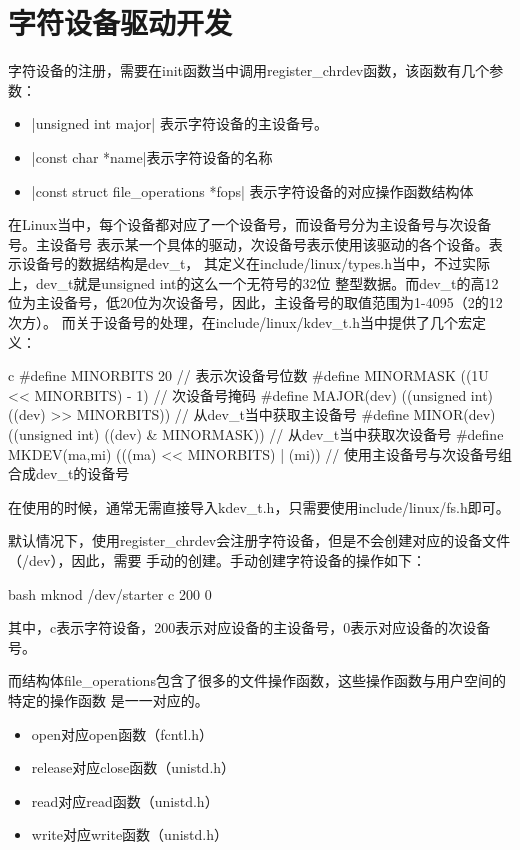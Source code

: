\section{字符设备驱动开发}
字符设备的注册，需要在init函数当中调用register\_chrdev函数，该函数有几个参数：
\begin{itemize}
    \item {}|unsigned int major| 表示字符设备的主设备号。
    \item {}|const char *name|表示字符设备的名称
    \item {}|const struct file_operations *fops| 表示字符设备的对应操作函数结构体
\end{itemize}

在Linux当中，每个设备都对应了一个设备号，而设备号分为主设备号与次设备号。主设备号
表示某一个具体的驱动，次设备号表示使用该驱动的各个设备。表示设备号的数据结构是dev\_t，
其定义在include/linux/types.h当中，不过实际上，dev\_t就是unsigned int的这么一个无符号的32位
整型数据。而dev\_t的高12位为主设备号，低20位为次设备号，因此，主设备号的取值范围为1-4095（2的12次方）。
而关于设备号的处理，在include/linux/kdev\_t.h当中提供了几个宏定义：

\begin{code-block}{c}
#define MINORBITS     20     // 表示次设备号位数
#define MINORMASK     ((1U << MINORBITS) - 1) // 次设备号掩码
#define MAJOR(dev)    ((unsigned int) ((dev) >> MINORBITS)) // 从dev_t当中获取主设备号
#define MINOR(dev)    ((unsigned int) ((dev) & MINORMASK))  // 从dev_t当中获取次设备号
#define MKDEV(ma,mi)  (((ma) << MINORBITS) | (mi)) // 使用主设备号与次设备号组合成dev_t的设备号
\end{code-block}
在使用的时候，通常无需直接导入kdev\_t.h，只需要使用include/linux/fs.h即可。

默认情况下，使用register\_chrdev会注册字符设备，但是不会创建对应的设备文件（/dev），因此，需要
手动的创建。手动创建字符设备的操作如下：
\begin{code-block}{bash}
mknod /dev/starter c 200 0
\end{code-block}
其中，c表示字符设备，200表示对应设备的主设备号，0表示对应设备的次设备号。

而结构体file\_operations包含了很多的文件操作函数，这些操作函数与用户空间的特定的操作函数
是一一对应的。
\begin{itemize}
    \item open对应open函数（fcntl.h）
    \item release对应close函数（unistd.h）
    \item read对应read函数（unistd.h）
    \item write对应write函数（unistd.h）
\end{itemize}

